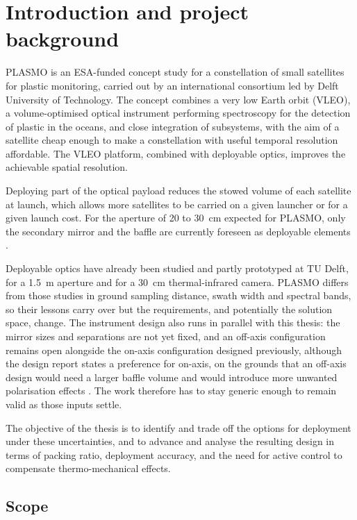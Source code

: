 \chapter{Introduction and project background}
\label{chapter:introduction}

PLASMO is an ESA-funded concept study for a constellation of small satellites for plastic monitoring, carried out by an international consortium led by Delft University of Technology. The concept combines a very low Earth orbit (VLEO), a volume-optimised optical instrument performing spectroscopy for the detection of plastic in the oceans, and close integration of subsystems, with the aim of a satellite cheap enough to make a constellation with useful temporal resolution affordable. The VLEO platform, combined with deployable optics, improves the achievable spatial resolution.

Deploying part of the optical payload reduces the stowed volume of each satellite at launch, which allows more satellites to be carried on a given launcher or for a given launch cost. For the aperture of 20 to \SI{30}{\centi\meter} expected for PLASMO, only the secondary mirror and the baffle are currently foreseen as deployable elements \cite{bouwmeester_plasmo_2026}.

Deployable optics have already been studied and partly prototyped at TU Delft, for a \SI{1.5}{\meter} aperture and for a \SI{30}{\centi\meter} thermal-infrared camera. PLASMO differs from those studies in ground sampling distance, swath width and spectral bands, so their lessons carry over but the requirements, and potentially the solution space, change. The instrument design also runs in parallel with this thesis: the mirror sizes and separations are not yet fixed, and an off-axis configuration remains open alongside the on-axis configuration designed previously, although the design report states a preference for on-axis, on the grounds that an off-axis design would need a larger baffle volume and would introduce more unwanted polarisation effects \cite{bouwmeester_plasmo_2026}. The work therefore has to stay generic enough to remain valid as those inputs settle.

The objective of the thesis is to identify and trade off the options for deployment under these uncertainties, and to advance and analyse the resulting design in terms of packing ratio, deployment accuracy, and the need for active control to compensate thermo-mechanical effects.

\section{Scope}
\label{sec:scope}

